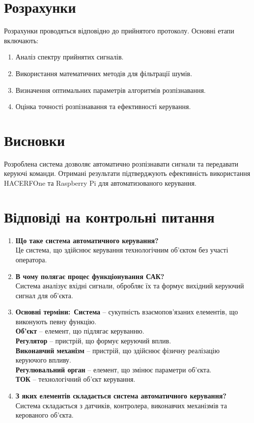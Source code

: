 \documentclass[a4paper]{article}
\begin{document}
\section*{Розрахунки}
Розрахунки проводяться відповідно до прийнятого протоколу. Основні етапи включають:
\begin{enumerate}
    \item Аналіз спектру прийнятих сигналів.
    \item Використання математичних методів для фільтрації шумів.
    \item Визначення оптимальних параметрів алгоритмів розпізнавання.
    \item Оцінка точності розпізнавання та ефективності керування.
\end{enumerate}


\section*{Висновки}
Розроблена система дозволяє автоматично розпізнавати сигнали та передавати керуючі команди. Отримані результати підтверджують ефективність використання HACERFOne та Raspberry Pi для автоматизованого керування.

\section*{Відповіді на контрольні питання}
\begin{enumerate}
    \item \textbf{Що таке система автоматичного керування?}\\
    Це система, що здійснює керування технологічним об'єктом без участі оператора.
    \item \textbf{В чому полягає процес функціонування САК?}\\
    Система аналізує вхідні сигнали, обробляє їх та формує вихідний керуючий сигнал для об'єкта.
    \item \textbf{Основні терміни:}\
    \textbf{Система} – сукупність взаємопов'язаних елементів, що виконують певну функцію.\\
    \textbf{Об’єкт} – елемент, що підлягає керуванню.\\
    \textbf{Регулятор} – пристрій, що формує керуючий вплив.\\
    \textbf{Виконавчий механізм} – пристрій, що здійснює фізичну реалізацію керуючого впливу.\\
    \textbf{Регулювальний орган} – елемент, що змінює параметри об'єкта.\\
    \textbf{ТОК} – технологічний об'єкт керування.
    \item \textbf{З яких елементів складається система автоматичного керування?}\\
    Система складається з датчиків, контролера, виконавчих механізмів та керованого об'єкта.
\end{enumerate}
\end{document}
